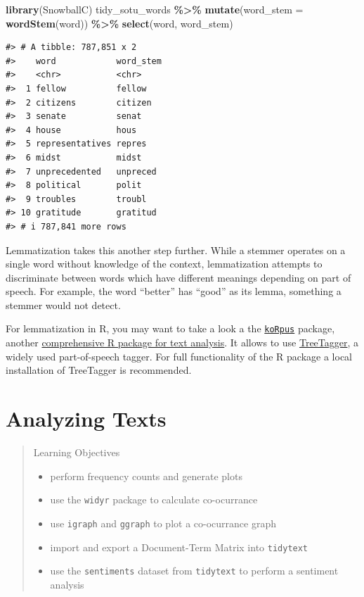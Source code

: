 \documentclass[
]{book}
\newenvironment{Shaded}{\begin{snugshade}}{\end{snugshade}}
\newcommand{\AttributeTok}[1]{\textcolor[rgb]{0.13,0.29,0.53}{#1}}
\newcommand{\FunctionTok}[1]{\textcolor[rgb]{0.13,0.29,0.53}{\textbf{#1}}}
\newcommand{\NormalTok}[1]{#1}
\newcommand{\SpecialCharTok}[1]{\textcolor[rgb]{0.81,0.36,0.00}{\textbf{#1}}}
\providecommand{\tightlist}{%
  \setlength{\itemsep}{0pt}\setlength{\parskip}{0pt}}
\begin{document}
\begin{Shaded}
\begin{Highlighting}[]
\FunctionTok{library}\NormalTok{(SnowballC)}
\NormalTok{tidy\_sotu\_words }\SpecialCharTok{\%\textgreater{}\%}
        \FunctionTok{mutate}\NormalTok{(}\AttributeTok{word\_stem =} \FunctionTok{wordStem}\NormalTok{(word)) }\SpecialCharTok{\%\textgreater{}\%} 
  \FunctionTok{select}\NormalTok{(word, word\_stem)}
\end{Highlighting}
\end{Shaded}

\begin{verbatim}
#> # A tibble: 787,851 x 2
#>    word            word_stem
#>    <chr>           <chr>    
#>  1 fellow          fellow   
#>  2 citizens        citizen  
#>  3 senate          senat    
#>  4 house           hous     
#>  5 representatives repres   
#>  6 midst           midst    
#>  7 unprecedented   unpreced 
#>  8 political       polit    
#>  9 troubles        troubl   
#> 10 gratitude       gratitud 
#> # i 787,841 more rows
\end{verbatim}

Lemmatization takes this another step further. While a stemmer operates on a single word without knowledge of the context, lemmatization attempts to discriminate between words which have different meanings depending on part of speech. For example, the word ``better'' has ``good'' as its lemma, something a stemmer would not detect.

For lemmatization in R, you may want to take a look a the \href{https://CRAN.R-project.org/package=koRpus}{\texttt{koRpus}} package, another \href{https://cran.r-project.org/web/packages/koRpus/vignettes/koRpus_vignette.html}{comprehensive R package for text analysis}. It allows to use \href{http://www.cis.uni-muenchen.de/~schmid/tools/TreeTagger/}{TreeTagger}, a widely used part-of-speech tagger. For full functionality of the R package a local installation of TreeTagger is recommended.

\chapter{Analyzing Texts}\label{textanalysis}

\begin{quote}
Learning Objectives

\begin{itemize}
\tightlist
\item
  perform frequency counts and generate plots
\item
  use the \texttt{widyr} package to calculate co-ocurrance
\item
  use \texttt{igraph} and \texttt{ggraph} to plot a co-ocurrance graph
\item
  import and export a Document-Term Matrix into \texttt{tidytext}
\item
  use the \texttt{sentiments} dataset from \texttt{tidytext} to perform a sentiment analysis
\end{itemize}
\end{quote}
\end{document}

